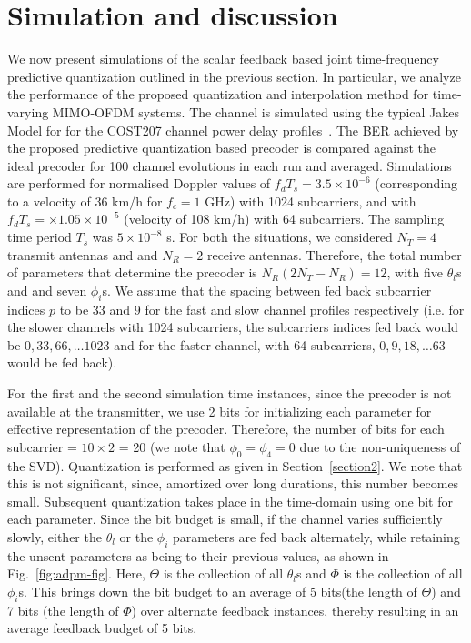 \documentclass[journal,10pt,twocolumn]{IEEEtran}
\begin{document}
\section{Simulation and discussion}
\label{section3}
We now present simulations of the scalar feedback based joint
time-frequency predictive quantization outlined in the previous
section. In particular, we analyze the performance of the proposed
quantization and interpolation method for time-varying MIMO-OFDM
systems. The channel is simulated using the typical Jakes Model for
for the COST207 channel power delay
profiles~\cite{molisch2006cost259,cost1989cost}. The BER achieved by
the proposed predictive quantization based precoder is compared
against the ideal precoder for 100 channel evolutions in each run and
averaged. Simulations are performed for normalised Doppler values of
$f_dT_s = 3.5\times 10^{-6}$ (corresponding to a velocity of 36 km/h
for $f_c = 1$ GHz) with 1024 subcarriers, and with
$f_dT_s = \times 1.05 \times 10^{-5}$ (velocity of 108 km/h) with 64
subcarriers. The sampling time period $T_s$ was $5\times10^{-8}$
s. For both the situations, we considered $N_T=4$ transmit antennas
and and $N_R=2$ receive antennas. Therefore, the total number of
parameters that determine the precoder is
$N_{R}(2N_{T} - N_{R}) = 12$, with five $\theta_l$s and and seven
$\phi_i$s. We assume that the spacing between fed back subcarrier
indices $p$ to be $33$ and $9$ for the fast and slow channel profiles
respectively (i.e. for the slower channels with 1024 subcarriers, the
subcarriers indices fed back would be $0, 33, 66, \ldots 1023$ and for
the faster channel, with 64 subcarriers, $0, 9, 18, \ldots 63$ would
be fed back).

For the first and the second simulation time instances, since the
precoder is not available at the transmitter, we use 2 bits for
initializing each parameter for effective representation of the
precoder. Therefore, the number of bits for each subcarrier =
$10\times 2$ = 20 (we note that $\phi_0 = \phi_4 = 0$ due to the
non-uniqueness of the SVD). Quantization is performed as given in
Section~\ref{section2}. We note that this is not significant, since,
amortized over long durations, this number becomes small. Subsequent
quantization takes place in the time-domain using one bit for each
parameter. Since the bit budget is small, if the channel varies
sufficiently slowly, either the $\theta_l$ or the $\phi_i$ parameters
are fed back alternately, while retaining the unsent parameters as
being to their previous values, as shown in
Fig.~\ref{fig:adpm-fig}. Here, $\Theta$ is the collection of all
$\theta_l$s and $\Phi$ is the collection of all $\phi_i$s. This brings
down the bit budget to an average of 5 bits(the length of $\Theta$)
and 7 bits (the length of $\Phi$) over alternate feedback instances,
thereby resulting in an average feedback budget of 5 bits.
\end{document}
